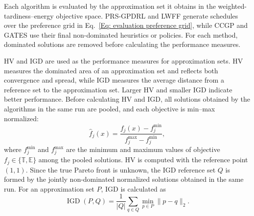 \documentclass[10pt,journal]{IEEEtran}
\begin{document}
Each algorithm is evaluated by the approximation set it obtains in the weighted-tardiness--energy objective space. PRS-GPDRL and LWFF generate schedules over the preference grid in Eq.~\eqref{Eq: evaluation preference grid}, while CCGP and GATES use their final non-dominated heuristics or policies. For each method, dominated solutions are removed before calculating the performance measures.

HV and IGD are used as the performance measures for approximation sets. HV measures the dominated area of an approximation set and reflects both convergence and spread, while IGD measures the average distance from a reference set to the approximation set. Larger HV and smaller IGD indicate better performance. Before calculating HV and IGD, all solutions obtained by the algorithms in the same run are pooled, and each objective is min--max normalized:
\begin{equation}
    \widehat{f}_j(x)=
    \frac{f_j(x)-f_j^{\min}}
    {f_j^{\max}-f_j^{\min}},
    \label{Eq: objective normalization}
\end{equation}
where $f_j^{\min}$ and $f_j^{\max}$ are the minimum and maximum values of objective $f_j\in\{\mathbb{T},\mathbb{E}\}$ among the pooled solutions. HV is computed with the reference point $(1,1)$. Since the true Pareto front is unknown, the IGD reference set $Q$ is formed by the jointly non-dominated normalized solutions obtained in the same run. For an approximation set $P$, IGD is calculated as
\begin{equation}
    \operatorname{IGD}(P,Q)=
    \frac{1}{|Q|}
    \sum_{q\in Q}
    \min_{p\in P}\lVert p-q\rVert_2.
    \label{Eq: IGD}
\end{equation}
\end{document}

